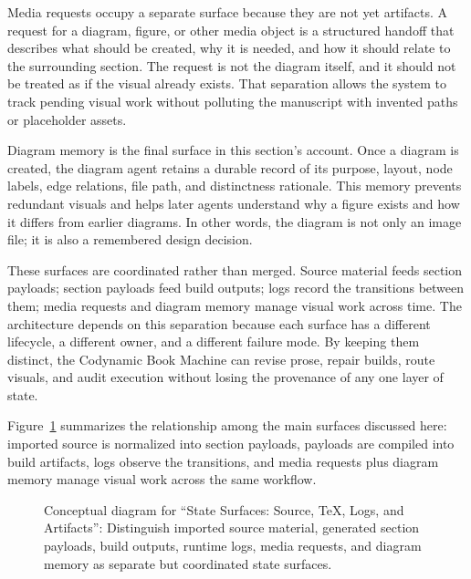 \documentclass[11pt]{article}
\begin{document}
Media requests occupy a separate surface because they are not yet artifacts. A request for a diagram, figure, or other media object is a structured handoff that describes what should be created, why it is needed, and how it should relate to the surrounding section. The request is not the diagram itself, and it should not be treated as if the visual already exists. That separation allows the system to track pending visual work without polluting the manuscript with invented paths or placeholder assets.

Diagram memory is the final surface in this section's account. Once a diagram is created, the diagram agent retains a durable record of its purpose, layout, node labels, edge relations, file path, and distinctness rationale. This memory prevents redundant visuals and helps later agents understand why a figure exists and how it differs from earlier diagrams. In other words, the diagram is not only an image file; it is also a remembered design decision.

These surfaces are coordinated rather than merged. Source material feeds section payloads; section payloads feed build outputs; logs record the transitions between them; media requests and diagram memory manage visual work across time. The architecture depends on this separation because each surface has a different lifecycle, a different owner, and a different failure mode. By keeping them distinct, the Codynamic Book Machine can revise prose, repair builds, route visuals, and audit execution without losing the provenance of any one layer of state.

Figure~\ref{fig:state-surfaces} summarizes the relationship among the main surfaces discussed here: imported source is normalized into section payloads, payloads are compiled into build artifacts, logs observe the transitions, and media requests plus diagram memory manage visual work across the same workflow.

\begin{figure}[htbp]
\centering

\caption{Conceptual diagram for ``State Surfaces: Source, TeX, Logs, and Artifacts'': Distinguish imported source material, generated section payloads, build outputs, runtime logs, media requests, and diagram memory as separate but coordinated state surfaces.}
\label{fig:state-surfaces}
\end{figure}
\end{document}
